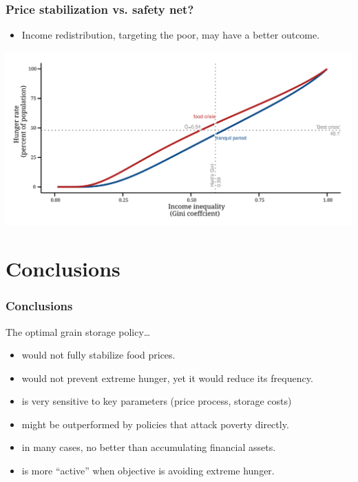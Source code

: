 \documentclass[svgnames]{beamer}
\begin{document}
\begin{frame}
\frametitle{Price stabilization vs. safety net?}
\begin{itemize}
\item  \small{Income redistribution, targeting the poor, may have a better outcome.}
\end{itemize}
\vspace{1em}
\centering
\includegraphics[width=\textwidth]{fig-Effect-Inequality}
\end{frame}







\section{Conclusions}
\begin{frame}
\frametitle{Conclusions}
The optimal grain storage policy\dots
  \begin{itemize}
    \item<1> would not fully stabilize food prices.
    \item<2> would not prevent extreme hunger, yet it would reduce its frequency.
    \item<3> is very sensitive to key parameters (price process, storage costs)
    \item<4> might be outperformed by policies that attack poverty directly.
    \item<5> in many cases, no better than accumulating financial assets.
    \item<6> is more “active” when objective is avoiding extreme hunger.
  \end{itemize}
\end{frame}
\end{document}
